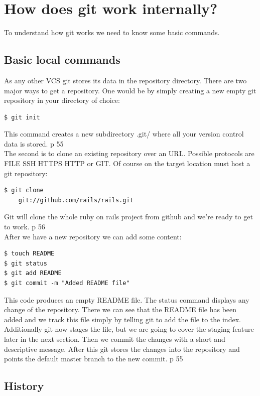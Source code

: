 \section{How does git work internally?}\label{howdoesgitwork}

To understand how git works we need to know some basic commands.

\subsection {Basic local commands}

As any other VCS git stores its data in the repository directory.
There are two major ways to get a repository.
One would be by simply creating a new empty git repository in your directory of choice:
\begin{lstlisting}
$ git init
\end{lstlisting}
This command creates a new subdirectory .git/ where all your version control
data is stored. \cite{gitinternals2008} p 55 \\
The second is to clone an existing repository over an URL. Possible protocols
are FILE SSH HTTPS HTTP or GIT. Of course on the target location must host a
git repository:
\begin{lstlisting}
$ git clone 
    git://github.com/rails/rails.git
\end{lstlisting}
Git will clone the whole ruby on rails project from github and we're
ready to get to work. \cite{gitinternals2008} p 56 \\

After we have a new repository we can add some content:
\begin{lstlisting}
$ touch README
$ git status
$ git add README
$ git commit -m "Added README file"
\end{lstlisting}

This code produces an empty README file. The status command displays any change
of the repository. There we can see that the README file has been added and we
track this file simply by telling git to add the file to the index. Additionally
git now stages the file, but we are going to cover the staging feature later in the next
section. Then we commit the changes with a short and descriptive message. After
this git stores the changes into the repository and points the default master
branch to the new commit. \cite{gitinternals2008} p 55 \\

\subsection {History}

